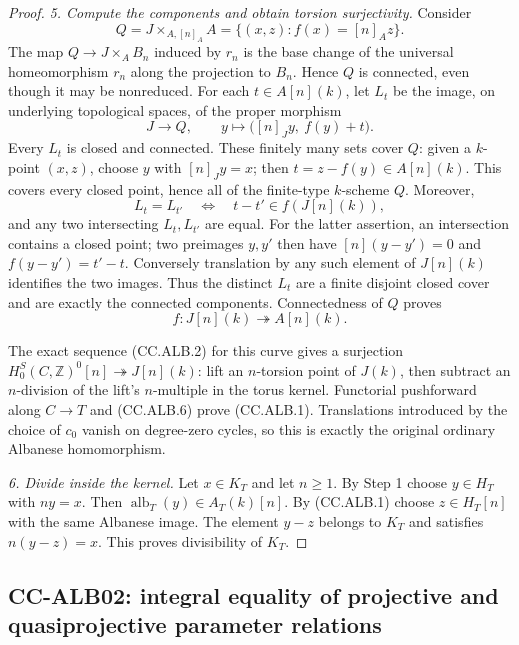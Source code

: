 \begin{proof}
\emph{5. Compute the components and obtain torsion
surjectivity.}
Consider
\[
 Q=J\times_{A,[n]_A}A
   =\{(x,z):f(x)=[n]_A z\}.
\]
The map $Q\to J\times_A B_n$ induced by $r_n$ is
the base change of the universal homeomorphism
$r_n$ along the projection to $B_n$.  Hence $Q$ is
connected, even though it may be nonreduced.
For each $t\in A[n](k)$, let $L_t$ be the image,
on underlying topological spaces, of the proper
morphism
\[
 J\longrightarrow Q,\qquad
 y\longmapsto\bigl([n]_J y,\ f(y)+t\bigr).           \tag{CC.ALB.4}
\]
Every $L_t$ is closed and connected.
These finitely many sets cover $Q$: given a
$k$-point $(x,z)$, choose $y$ with $[n]_J y=x$;
then $t=z-f(y)\in A[n](k)$.
This covers every closed point, hence all of the
finite-type $k$-scheme $Q$.
Moreover,
\[
 L_t=L_{t'}
 \quad\Longleftrightarrow\quad
 t-t'\in f(J[n](k)),                               \tag{CC.ALB.5}
\]
and any two intersecting $L_t,L_{t'}$ are equal.
For the latter assertion, an intersection contains
a closed point; two preimages $y,y'$ then have
$[n](y-y')=0$ and $f(y-y')=t'-t$.
Conversely translation by any such element of
$J[n](k)$ identifies the two images.
Thus the distinct $L_t$ are a finite disjoint closed
cover and are exactly the connected components.
Connectedness of $Q$ proves
\[
 f:J[n](k)\twoheadrightarrow A[n](k).               \tag{CC.ALB.6}
\]

The exact sequence (CC.ALB.2) for this curve gives a
surjection
$H^S_0(C,\mathbb Z)^0[n]\twoheadrightarrow J[n](k)$:
lift an $n$-torsion point of $J(k)$, then subtract
an $n$-division of the lift's $n$-multiple in the
torus kernel.  Functorial pushforward along $C\to T$
and (CC.ALB.6) prove (CC.ALB.1).
Translations introduced by the choice of $c_0$ vanish
on degree-zero cycles, so this is exactly the original
ordinary Albanese homomorphism.

\emph{6. Divide inside the kernel.}
Let $x\in K_T$ and let $n\geq1$.  By Step 1 choose
$y\in H_T$ with $ny=x$.
Then $\operatorname{alb}_T(y)\in A_T(k)[n]$.
By (CC.ALB.1) choose $z\in H_T[n]$ with the same
Albanese image.  The element $y-z$ belongs to $K_T$
and satisfies $n(y-z)=x$.  This proves divisibility
of $K_T$.
\end{proof}

\subsection{CC-ALB02: integral equality of projective and
quasiprojective parameter relations}

